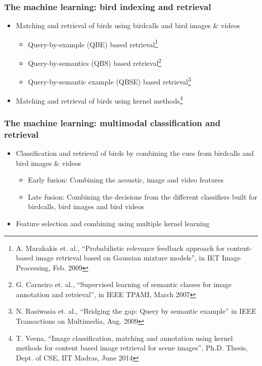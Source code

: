 \documentclass[mathserif]{beamer}
\begin{document}
\begin{frame}
\frametitle{The machine learning: bird indexing and retrieval}
\begin{itemize}
\item<2-> Matching and retrieval of birds using birdcalls and bird images \& videos
\begin{itemize}
      \item Query-by-example (QBE) based retrieval\footnote{
	A. Marakakis et. al., ``Probabilistic relevance feedback approach for content-based image retrieval based on Gaussian mixture models'', in IET Image Processing, Feb. 2009}
      \item Query-by-semantics (QBS) based retrieval\footnote{
	G. Carneiro et. al., ``Supervised learning of semantic classes for image annotation and retrieval'', in IEEE TPAMI, March 2007}
      \item Query-by-semantic example (QBSE) based retrieval\footnote{
	N. Rasiwasia et. al., ``Bridging the gap: Query by semantic example'' in IEEE Transactions on Multimedia, Aug. 2009}
\end{itemize}
\item<3-> Matching and retrieval of birds using kernel methods\footnote{
	T. Veena, ``Image classification, matching and annotation using kernel methods for content based image retrieval for scene images'', Ph.D. Thesis, Dept. of CSE, IIT Madras, June 2014}   
\end{itemize}
\end{frame}

\begin{frame}
\frametitle{The machine learning: multimodal classification and retrieval}
\begin{itemize}
\item<2-> Classification and retrieval of birds by combining the cues from birdcalls and bird images \& videos
\begin{itemize}
      \item Early fusion: Combining the acoustic, image and video features
      \item Late fusion: Combining the decisions from the different classifiers built for birdcalls, bird images and bird videos
 \end{itemize}
\item<3-> Feature selection and combining using multiple kernel learning
\end{itemize}
\end{frame}
\end{document}
